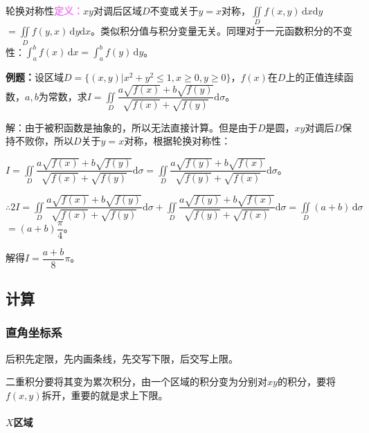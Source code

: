 轮换对称性\textcolor{violet}{\textbf{定义：}}$xy$对调后区域$D$不变或关于$y=x$对称，$\iint\limits_Df(x,y)\,\textrm{d}x\textrm{d}y$\\$=\iint\limits_Df(y,x)\,\textrm{d}y\textrm{d}x$。类似积分值与积分变量无关。同理对于一元函数积分的不变性：$\int_a^bf(x)\,\textrm{d}x=\int_a^bf(y)\,\textrm{d}y$。

\textbf{例题：}设区域$D=\{(x,y)|x^2+y^2\leqslant1,x\geqslant0,y\geqslant0\}$，$f(x)$在$D$上的正值连续函数，$a,b$为常数，求$I=\displaystyle{\iint\limits_D\dfrac{a\sqrt{f(x)}+b\sqrt{f(y)}}{\sqrt{f(x)}+\sqrt{f(y)}}\textrm{d}\sigma}$。

解：由于被积函数是抽象的，所以无法直接计算。但是由于$D$是圆，$xy$对调后$D$保持不败你，所以$D$关于$y=x$对称，根据轮换对称性：\medskip

$I=\displaystyle{\iint\limits_D\dfrac{a\sqrt{f(x)}+b\sqrt{f(y)}}{\sqrt{f(x)}+\sqrt{f(y)}}\textrm{d}\sigma=\iint\limits_D\dfrac{a\sqrt{f(y)}+b\sqrt{f(x)}}{\sqrt{f(y)}+\sqrt{f(x)}}\textrm{d}\sigma}$。

$\therefore2I=\displaystyle{\iint\limits_D\dfrac{a\sqrt{f(x)}+b\sqrt{f(y)}}{\sqrt{f(x)}+\sqrt{f(y)}}\textrm{d}\sigma+\iint\limits_D\dfrac{a\sqrt{f(y)}+b\sqrt{f(x)}}{\sqrt{f(y)}+\sqrt{f(x)}}\textrm{d}\sigma}=\iint\limits_D(a+b)\,\textrm{d}\sigma$\\$=(a+b)\dfrac{\pi}{4}$。

解得$I=\dfrac{a+b}{8}\pi$。

\subsection{计算}

\subsubsection{直角坐标系}

后积先定限，先内画条线，先交写下限，后交写上限。

二重积分要将其变为累次积分，由一个区域的积分变为分别对$xy$的积分，要将$f(x,y)$拆开，重要的就是求上下限。

\paragraph{\texorpdfstring{$X$}型区域} \leavevmode \medskip

